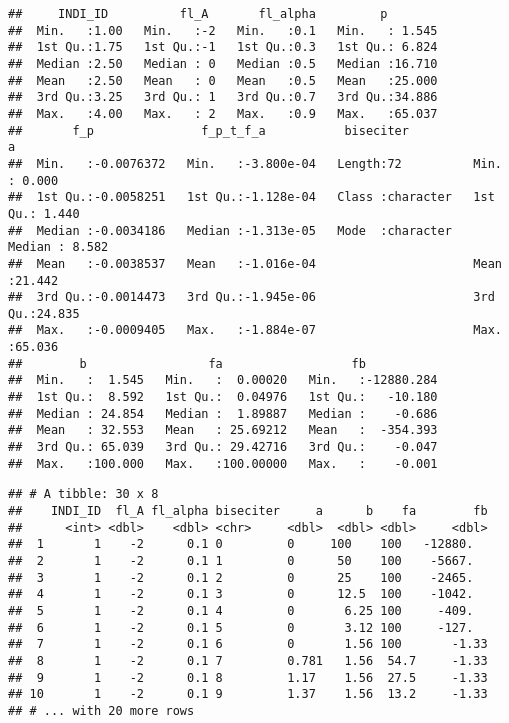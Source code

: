 \documentclass[]{article}
\newenvironment{Shaded}{\begin{snugshade}}{\end{snugshade}}
\newcommand{\DecValTok}[1]{\textcolor[rgb]{0.00,0.00,0.81}{#1}}
\newcommand{\KeywordTok}[1]{\textcolor[rgb]{0.13,0.29,0.53}{\textbf{#1}}}
\newcommand{\NormalTok}[1]{#1}
\newcommand{\OperatorTok}[1]{\textcolor[rgb]{0.81,0.36,0.00}{\textbf{#1}}}
\newcommand{\StringTok}[1]{\textcolor[rgb]{0.31,0.60,0.02}{#1}}
\begin{document}
\begin{verbatim}
##     INDI_ID          fl_A       fl_alpha         p         
##  Min.   :1.00   Min.   :-2   Min.   :0.1   Min.   : 1.545  
##  1st Qu.:1.75   1st Qu.:-1   1st Qu.:0.3   1st Qu.: 6.824  
##  Median :2.50   Median : 0   Median :0.5   Median :16.710  
##  Mean   :2.50   Mean   : 0   Mean   :0.5   Mean   :25.000  
##  3rd Qu.:3.25   3rd Qu.: 1   3rd Qu.:0.7   3rd Qu.:34.886  
##  Max.   :4.00   Max.   : 2   Max.   :0.9   Max.   :65.037  
##       f_p               f_p_t_f_a           biseciter               a         
##  Min.   :-0.0076372   Min.   :-3.800e-04   Length:72          Min.   : 0.000  
##  1st Qu.:-0.0058251   1st Qu.:-1.128e-04   Class :character   1st Qu.: 1.440  
##  Median :-0.0034186   Median :-1.313e-05   Mode  :character   Median : 8.582  
##  Mean   :-0.0038537   Mean   :-1.016e-04                      Mean   :21.442  
##  3rd Qu.:-0.0014473   3rd Qu.:-1.945e-06                      3rd Qu.:24.835  
##  Max.   :-0.0009405   Max.   :-1.884e-07                      Max.   :65.036  
##        b                 fa                  fb            
##  Min.   :  1.545   Min.   :  0.00020   Min.   :-12880.284  
##  1st Qu.:  8.592   1st Qu.:  0.04976   1st Qu.:   -10.180  
##  Median : 24.854   Median :  1.89887   Median :    -0.686  
##  Mean   : 32.553   Mean   : 25.69212   Mean   :  -354.393  
##  3rd Qu.: 65.039   3rd Qu.: 29.42716   3rd Qu.:    -0.047  
##  Max.   :100.000   Max.   :100.00000   Max.   :    -0.001
\end{verbatim}

\begin{Shaded}
\end{Shaded}

\begin{verbatim}
## # A tibble: 30 x 8
##    INDI_ID  fl_A fl_alpha biseciter     a      b    fa        fb
##      <int> <dbl>    <dbl> <chr>     <dbl>  <dbl> <dbl>     <dbl>
##  1       1    -2      0.1 0         0     100    100   -12880.  
##  2       1    -2      0.1 1         0      50    100    -5667.  
##  3       1    -2      0.1 2         0      25    100    -2465.  
##  4       1    -2      0.1 3         0      12.5  100    -1042.  
##  5       1    -2      0.1 4         0       6.25 100     -409.  
##  6       1    -2      0.1 5         0       3.12 100     -127.  
##  7       1    -2      0.1 6         0       1.56 100       -1.33
##  8       1    -2      0.1 7         0.781   1.56  54.7     -1.33
##  9       1    -2      0.1 8         1.17    1.56  27.5     -1.33
## 10       1    -2      0.1 9         1.37    1.56  13.2     -1.33
## # ... with 20 more rows
\end{verbatim}
\end{document}
